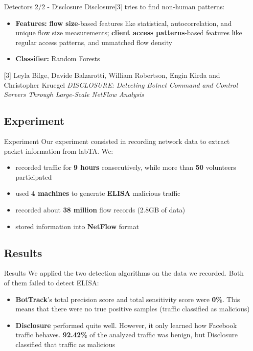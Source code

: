 \documentclass{beamer}
\begin{document}
	\begin{frame}{Detectors 2/2 - Disclosure}
		Disclosure[3] tries to find non-human patterns:
		\begin{itemize}
			\item \textbf{Features:} \textbf{flow size}-based features like statistical, autocorrelation, and unique flow size measurements; \textbf{client access patterns}-based features like regular access patterns, and unmatched flow density
			\item \textbf{Classifier:} Random Forests
		\end{itemize}
	
		{\footnotesize \vspace{.5cm}
			[3]	Leyla Bilge, Davide Balzarotti, William Robertson, Engin Kirda and Christopher Kruegel \emph{DISCLOSURE: Detecting Botnet Command and Control Servers Through Large-Scale NetFlow Analysis} \par
		}
	\end{frame}

	\subsection{Experiment}

	\begin{frame}{Experiment}
		Our experiment consisted in recording network data to extract packet information from labTA. We:
		\begin{itemize}
			\item recorded traffic for \textbf{9 hours} consecutively, while more than \textbf{50} volunteers participated
			\item used \textbf{4 machines} to generate \textbf{ELISA} malicious traffic
			\item recorded about \textbf{38 million} flow records (2.8GB of data)
			\item stored information into \textbf{NetFlow} format
		\end{itemize}
	\end{frame}
	
	\subsection{Results}
	
	\begin{frame}{Results}
		We applied the two detection algorithms on the data we recorded. Both of them failed to detect ELISA:
		\begin{itemize}
			\item \textbf{BotTrack}'s total precision score and total sensitivity score were \textbf{0\%}. This means that there were no true positive samples (traffic classified as malicious)
			\item \textbf{Disclosure} performed quite well. However, it only learned how Facebook traffic behaves. \textbf{92.42\%} of the analyzed traffic was benign, but Disclosure classified that traffic as malicious
		\end{itemize}
	\end{frame}
	
\end{document}
